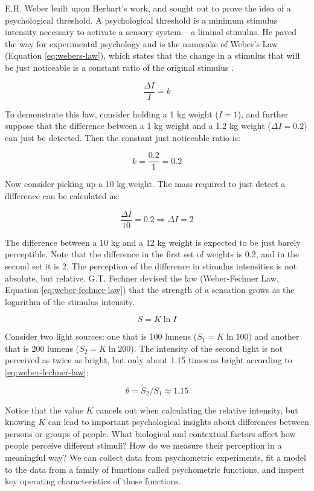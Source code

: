 \documentclass[11pt, oneside, openany]{scrbook}
\begin{document}
E.H. Weber built upon Herbart's work, and sought out to prove the idea of a psychological threshold. A psychological threshold is a minimum stimulus intensity necessary to activate a sensory system -- a liminal stimulus. He paved the way for experimental psychology and is the namesake of Weber's Law (Equation \eqref{eq:webers-law}), which states that the change in a stimulus that will be just noticeable is a constant ratio of the original stimulus \citep{ekman1959weber}.

\begin{equation}
  \frac{\Delta I}{I} = k
  \label{eq:webers-law}
\end{equation}

To demonstrate this law, consider holding a 1 kg weight (\(I = 1\)), and further suppose that the difference between a 1 kg weight and a 1.2 kg weight (\(\Delta I = 0.2\)) can just be detected. Then the constant just noticeable ratio is:

\[k = \frac{0.2}{1} = 0.2\]

Now consider picking up a 10 kg weight. The mass required to just detect a difference can be calculated as:

\[\frac{\Delta I}{10} = 0.2 \Rightarrow \Delta I = 2\]

The difference between a 10 kg and a 12 kg weight is expected to be just barely perceptible. Note that the difference in the first set of weights is 0.2, and in the second set it is 2. The perception of the difference in stimulus intensities is not absolute, but relative. G.T. Fechner devised the law (Weber-Fechner Law, Equation \eqref{eq:weber-fechner-law}) that the strength of a sensation grows as the logarithm of the stimulus intensity.

\begin{equation}
  S = K \ln I
  \label{eq:weber-fechner-law}
\end{equation}

Consider two light sources: one that is 100 lumens (\(S_1 = K \ln 100\)) and another that is 200 lumens (\(S_2 = K \ln 200\)). The intensity of the second light is not perceived as twice as bright, but only about 1.15 times as bright according to \eqref{eq:weber-fechner-law}:

\[\theta = S_2 / S_1 \approx 1.15\]

Notice that the value \(K\) cancels out when calculating the relative intensity, but knowing \(K\) can lead to important psychological insights about differences between persons or groups of people. What biological and contextual factors affect how people perceive different stimuli? How do we measure their perception in a meaningful way? We can collect data from psychometric experiments, fit a model to the data from a family of functions called psychometric functions, and inspect key operating characteristics of those functions.
\end{document}

